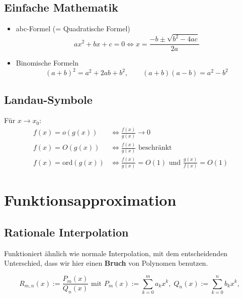\documentclass[a4paper]{article}
\begin{document}
\subsection{Einfache Mathematik}
\begin{itemize}
	\item abc-Formel (= Quadratische Formel)
		\[
			a x ^2 + b x + c = 0
			\Leftrightarrow 
			x = \frac{ -b \pm \sqrt{b ^2 - 4 ac} }{ 2a }
		\] 
	\item Binomische Formeln
		\[
			(a+b)^2 = a ^2 + 2ab + b ^2, \qquad
			(a+b)(a-b) = a ^2 - b ^2
		\] 
\end{itemize}

\subsection{Landau-Symbole}
Für $x \to x_0$:
\begin{align*}
	f(x) = o(g(x))
	&\Leftrightarrow \frac{ f(x) }{ g(x) } \to 0 \\
	f(x) = O(g(x))
	&\Leftrightarrow \frac{ f(x) }{ g(x) } \text{ beschränkt } \\
	f(x) = \text{ord}(g(x))
	&\Leftrightarrow 
	\frac{ f(x) }{ g(x) } = O(1) \text{ und }
	\frac{ g(x) }{ f(x) } = O(1)
\end{align*}

\pagebreak

\section{Funktionsapproximation}

\subsection{Rationale Interpolation}

Funktioniert ähnlich wie normale Interpolation, mit dem entscheidenden
Unterschied, dass wir hier einen \textbf{Bruch} von Polynomen benutzen.

\[
	R_{m, n} (x) := \frac{ 
		P_m (x)
	}{ Q_n (x) } \text{ mit }
	P_m (x) := \sum_{k=0}^{m} a_k x^{k}, \;
	Q_n (x) := \sum_{k=0}^{n} b_k x^{k}, \;
\] 
\end{document}
